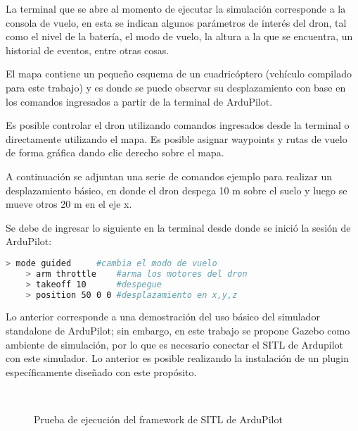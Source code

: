 La terminal que se abre al momento de ejecutar la simulación corresponde a la consola de vuelo, en esta se indican algunos parámetros de interés del dron, tal como el nivel de la batería, el modo de vuelo, la altura a la que se encuentra, un historial de eventos, entre otras cosas.

El mapa contiene un pequeño esquema de un cuadricóptero (vehículo compilado para este trabajo) y es donde se puede observar su desplazamiento con base en los comandos ingresados a partir de la terminal de ArduPilot.

Es posible controlar el dron utilizando comandos ingresados desde la terminal o directamente utilizando el mapa. Es posible asignar waypoints y rutas de vuelo de forma gráfica dando clic derecho sobre el mapa.

A continuación se adjuntan una serie de comandos ejemplo para realizar un desplazamiento básico, en donde el dron despega 10 m sobre el suelo y luego se mueve otros 20 m en el eje x.

Se debe de ingresar lo siguiente en la terminal desde donde se inició la sesión de ArduPilot:

\begin{lstlisting}[language = bash]
    > mode guided     #cambia el modo de vuelo
    > arm throttle    #arma los motores del dron
    > takeoff 10      #despegue
    > position 50 0 0 #desplazamiento en x,y,z
\end{lstlisting}  

Lo anterior corresponde a una demostración del uso básico del simulador standalone de ArduPilot; sin embargo, en este trabajo se propone Gazebo como ambiente de simulación, por lo que es necesario conectar el SITL de Ardupilot con este simulador. Lo anterior es posible realizando la instalación de un plugin específicamente diseñado con este propósito.


\begin{figure}[ht]
    \centering
    \hfill
    \\
    \hfill
    \caption{Prueba de ejecución del framework de SITL de ArduPilot}
    \label{fig:Ardupilot}
\end{figure}


